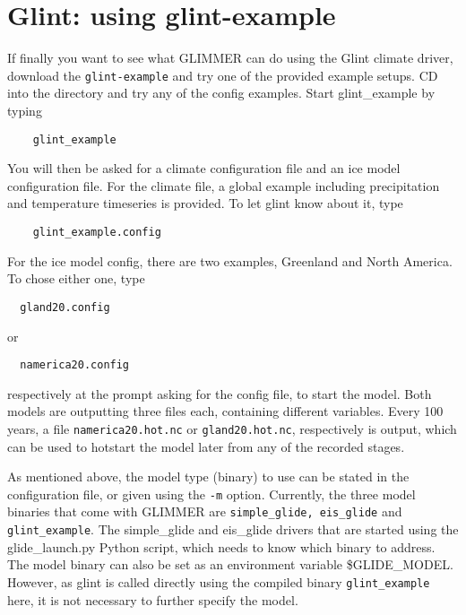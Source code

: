 \section{Glint: using glint-example}
If finally you want to see what GLIMMER can do using the Glint climate driver,
download the \texttt{glint-example} and try one of the provided example setups.
CD into the directory and try any of the config examples. Start glint\_example
by typing
\begin{verbatim}
    glint_example
\end{verbatim}
You will then be asked for a climate configuration file and an ice model 
configuration file.
For the climate file, a global example including precipitation and temperature timeseries
is provided. To let glint know about it, type
\begin{verbatim}
    glint_example.config
\end{verbatim}
For the ice model config, there are two examples, Greenland and North America. To chose either one, type
\begin{verbatim}
  gland20.config
\end{verbatim}
or
\begin{verbatim}
  namerica20.config
\end{verbatim}
respectively at the prompt asking for the config file, to start the model.
Both models are outputting three files each, containing different variables.
Every 100 years, a file \texttt{namerica20.hot.nc} or \texttt{gland20.hot.nc}, respectively is output, 
which can be used to hotstart the model later from any of the recorded stages.

As mentioned above, the model type (binary) to use can be stated in the configuration file,
or given using the \texttt{-m} option. Currently, the three model binaries that
come with GLIMMER are \texttt{simple\_glide, eis\_glide} and
\texttt{glint\_example}. The simple\_glide and eis\_glide drivers that are started using the glide\_launch.py Python script,
which needs to know which binary to address. The model binary can also be set as an environment variable \$GLIDE\_MODEL. 
However, as glint is called directly using the compiled binary \texttt{glint\_example} here, it is not necessary to further 
specify the model.


%


